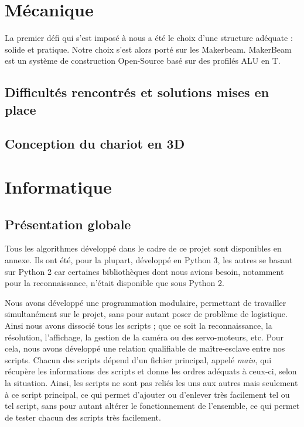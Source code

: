 \documentclass[12pt,a4paper]{report}
\begin{document}
	\chapter{Mécanique}
	
	La premier défi qui s'est imposé à nous a été le choix d'une structure adéquate : solide et pratique. Notre choix s'est alors porté sur les Makerbeam. MakerBeam est un système de construction Open-Source basé sur des profilés ALU en T.
	\section{Difficultés rencontrés et solutions mises en place}
	\section{Conception du chariot en 3D}

	
	\chapter{Informatique}
\section{Présentation globale}
	Tous les algorithmes développé dans le cadre de ce projet sont disponibles en annexe. Ils ont été, pour la plupart, développé en Python 3, les autres se basant sur Python 2 car certaines bibliothèques dont nous avions besoin, notamment pour la reconnaissance, n'était disponible que sous Python 2. 
	
	Nous avons développé une programmation modulaire, permettant de travailler simultanément sur le projet, sans pour autant poser de problème de logistique. Ainsi nous avons dissocié tous les scripts ; que ce soit la reconnaissance, la résolution, l'affichage, la gestion de la caméra ou des servo-moteurs, etc. Pour cela, nous avons développé une relation qualifiable de maître-esclave entre nos scripts. Chacun des scripts dépend d'un fichier principal, appelé \emph{main}, qui récupère les informations des scripts et donne les ordres adéquats à ceux-ci, selon la situation. Ainsi, les scripts ne sont pas reliés les uns aux autres mais seulement à ce script principal, ce qui permet d'ajouter ou d'enlever très facilement tel ou tel script, sans pour autant altérer le fonctionnement de l'ensemble, ce qui permet de tester chacun des scripts très facilement.
	
\end{document}
